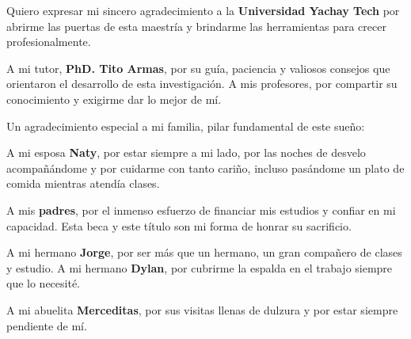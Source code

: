 Quiero expresar mi sincero agradecimiento a la \textbf{Universidad Yachay Tech} por abrirme las puertas de esta maestría y brindarme las herramientas para crecer profesionalmente.

A mi tutor, \textbf{PhD. Tito Armas}, por su guía, paciencia y valiosos consejos que orientaron el desarrollo de esta investigación. A mis profesores, por compartir su conocimiento y exigirme dar lo mejor de mí.

Un agradecimiento especial a mi familia, pilar fundamental de este sueño:

A mi esposa \textbf{Naty}, por estar siempre a mi lado, por las noches de desvelo acompañándome y por cuidarme con tanto cariño, incluso pasándome un plato de comida mientras atendía clases.

A mis \textbf{padres}, por el inmenso esfuerzo de financiar mis estudios y confiar en mi capacidad. Esta beca y este título son mi forma de honrar su sacrificio.

A mi hermano \textbf{Jorge}, por ser más que un hermano, un gran compañero de clases y estudio. A mi hermano \textbf{Dylan}, por cubrirme la espalda en el trabajo siempre que lo necesité.

A mi abuelita \textbf{Merceditas}, por sus visitas llenas de dulzura y por estar siempre pendiente de mí.
